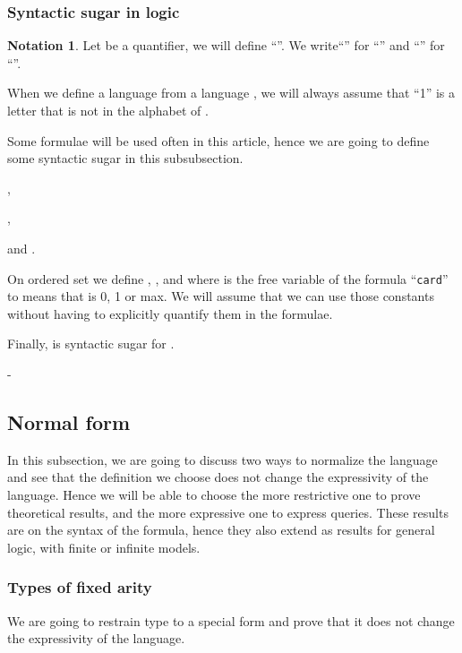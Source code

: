 \documentclass[a4paper,12pt]{article}
\newcommand{\sss}[1]{\subsubsection{#1}}
\theoremstyle{definition}
\newtheorem{notation}[theorem]{Notation}
\begin{document}
\sss{Syntactic sugar in logic}
\begin{notation}
  Let  be a quantifier, we will define ``''.  We
  write``'' for ``'' and
  ``'' for ``''.

  When we define a language  from a language , we will always
  assume that ``1'' is a letter that is not in the alphabet of .
\end{notation}


Some formulae will be used often in this article, hence we are going
to define some syntactic sugar in this subsubsection.

,

,

and .

On ordered set we define ,
, and  where
 is the free variable of the formula ``\texttt{card}'' to means
that  is 0, 1 or max. We will assume that we can use those constants
without having to explicitly quantify them in the formulae.

Finally,  is syntactic sugar for .

-

































\subsection{Normal form}
In this subsection, we are going to discuss two ways to normalize the
language and see that the definition we choose does not change the
expressivity of the language. Hence we will be able to choose the more
restrictive one to prove theoretical results, and the more expressive
one to express queries.  These results are on the syntax of the
formula, hence they also extend as results for general logic, with
finite or infinite models.


\sss{Types of fixed arity}\label{sec:arity}
We are going to restrain type to a special form and prove that it does
not change the expressivity of the language.
\end{document}
